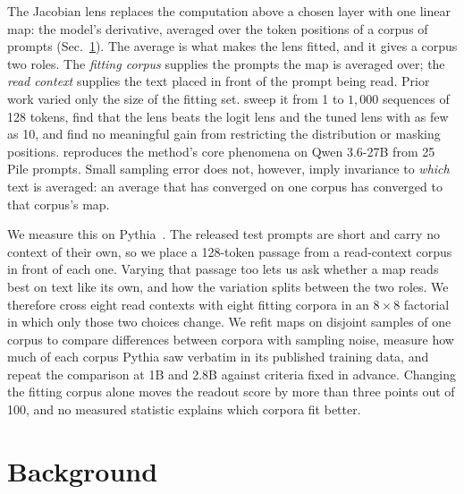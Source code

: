 \documentclass{article}
\begin{document}
The Jacobian lens replaces the computation above a chosen layer with one linear map: the model's
derivative, averaged over the token positions of a corpus of prompts (Sec.~\ref{sec:background}).
The average is what makes the lens fitted, and it gives a corpus two roles. The \emph{fitting corpus}
supplies the prompts the map is averaged over; the \emph{read context} supplies the text placed in
front of the prompt being read. Prior work varied only the size of the fitting set.
\citet{gurnee2026} sweep it from 1 to $1{,}000$ sequences of 128 tokens, find that the lens beats
the logit lens and the tuned lens with as few as 10, and find no meaningful gain from restricting the
distribution or masking positions. \citet{nanda2026review} reproduces the method's core phenomena on
Qwen 3.6-27B from 25 Pile prompts. Small sampling error does not, however, imply invariance to
\emph{which} text is averaged: an average that has converged on one corpus has converged to that
corpus's map.

We measure this on Pythia~\citep{biderman2023pythia}. The released test prompts are short and carry
no context of their own, so we place a 128-token passage from a read-context corpus in front of each
one. Varying that passage too lets us ask whether a map reads best on text like its own, and how the
variation splits between the two roles. We therefore cross eight read contexts with eight fitting
corpora in an $8\times8$ factorial in which only those two choices change. We refit maps on disjoint samples of one corpus to compare differences
between corpora with sampling noise, measure how much of each corpus Pythia saw verbatim in its
published training data, and repeat the comparison at 1B and 2.8B against criteria fixed in advance.
Changing the fitting corpus alone moves the readout score by more than three points out of 100, and
no measured statistic explains which corpora fit better.

\section{Background}
\label{sec:background}
\end{document}
